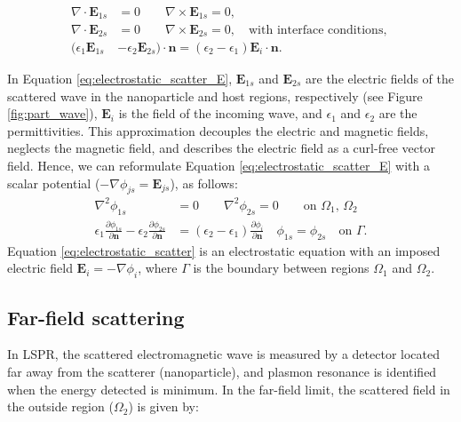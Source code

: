 \begin{align} \label{eq:electrostatic_scatter_E}
\nabla \cdot \mathbf{E}_{1s} &= 0 \qquad \nabla \times \mathbf{E}_{1s} = 0, \nonumber \\
\nabla \cdot \mathbf{E}_{2s} &= 0 \qquad \nabla \times \mathbf{E}_{2s} = 0, \nonumber \quad
\text{with interface conditions, } \nonumber \\
(\epsilon_1\mathbf{E}_{1s} &- \epsilon_2\mathbf{E}_{2s})\cdot\mathbf{n} = (\epsilon_2-\epsilon_1)\mathbf{E}_i\cdot \mathbf{n}.
\end{align}

In Equation \eqref{eq:electrostatic_scatter_E}, $\mathbf{E}_{1s}$ and $\mathbf{E}_{2s}$ 
are the electric fields of the scattered wave in the nanoparticle and host regions, respectively 
(see Figure \ref{fig:part_wave}), $\mathbf{E}_{i}$ is the field of the incoming wave, and $\epsilon_1$ 
and $\epsilon_2$ are the permittivities. This approximation decouples the electric and magnetic fields, neglects the magnetic field, 
and describes the electric field as a curl-free vector field. Hence, we can reformulate Equation \eqref{eq:electrostatic_scatter_E} with a scalar potential
($-\nabla \phi_{js} = \mathbf{E}_{js}$), as follows:
%
\begin{align} \label{eq:electrostatic_scatter}
\nabla^2 \phi_{1s} &= 0 \qquad \nabla^2 \phi_{2s} = 0 \qquad\text{on $\Omega_1$, $\Omega_2$} \nonumber \\
\epsilon_1\frac{\partial\phi_{1s}}{\partial \mathbf{n}} - \epsilon_2\frac{\partial\phi_{2s}}{\partial\mathbf{n}} &= (\epsilon_2-\epsilon_1)\frac{\partial\phi_i}{\partial\mathbf{n}} \quad \phi_{1s} = \phi_{2s} \quad \text{on $\Gamma$}.
\end{align}
%
Equation \eqref{eq:electrostatic_scatter} is an electrostatic equation with an imposed electric
field $\mathbf{E}_i=-\nabla\phi_i$, where $\Gamma$ is the boundary between regions $\Omega_1$ and $\Omega_2$.

\subsection{Far-field scattering} \label{sec:ff_scattering}

In LSPR, the scattered electromagnetic wave is measured by a detector located far away 
from the scatterer (nanoparticle), and plasmon resonance is identified when the energy 
detected is minimum. In the far-field limit, the scattered field
in the outside region ($\Omega_2$) is given by: 

